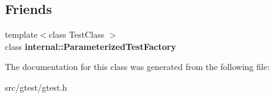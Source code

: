\subsection*{Friends}
\begin{DoxyCompactItemize}
\item 
\mbox{\label{classtesting_1_1_with_param_interface_a7543eb7df89f00fff517dba24bc11dd5}} 
{\footnotesize template$<$class Test\+Class $>$ }\\class {\bfseries internal\+::\+Parameterized\+Test\+Factory}
\end{DoxyCompactItemize}


The documentation for this class was generated from the following file\+:\begin{DoxyCompactItemize}
\item 
src/gtest/gtest.\+h\end{DoxyCompactItemize}
